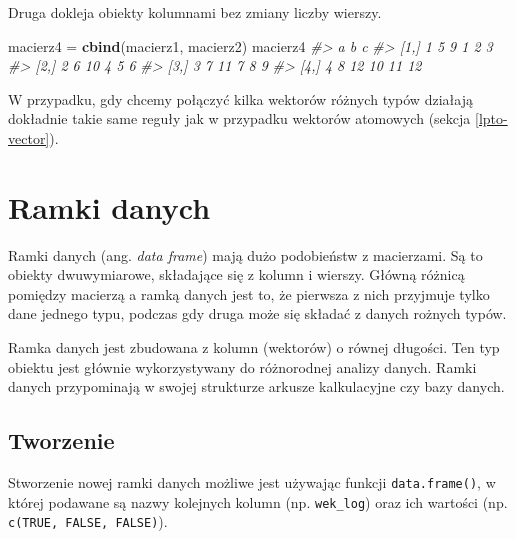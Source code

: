 \documentclass[paper=6in:9in,pagesize=pdftex,headinclude=on,footinclude=on,10pt]{scrbook}
\newenvironment{Shaded}{\begin{snugshade}}{\end{snugshade}}
\newcommand{\CommentTok}[1]{\textcolor[rgb]{0.56,0.35,0.01}{\textit{#1}}}
\newcommand{\KeywordTok}[1]{\textcolor[rgb]{0.13,0.29,0.53}{\textbf{#1}}}
\newcommand{\NormalTok}[1]{#1}
\newcommand{\StringTok}[1]{\textcolor[rgb]{0.31,0.60,0.02}{#1}}
\let\BeginKnitrBlock\begin \let\EndKnitrBlock\end
\begin{document}
Druga dokleja obiekty kolumnami bez zmiany liczby wierszy.

\begin{Shaded}
\begin{Highlighting}[]
\NormalTok{macierz4 =}\StringTok{ }\KeywordTok{cbind}\NormalTok{(macierz1, macierz2)}
\NormalTok{macierz4}
\CommentTok{#>              a  b  c}
\CommentTok{#> [1,] 1 5  9  1  2  3}
\CommentTok{#> [2,] 2 6 10  4  5  6}
\CommentTok{#> [3,] 3 7 11  7  8  9}
\CommentTok{#> [4,] 4 8 12 10 11 12}
\end{Highlighting}
\end{Shaded}

\BeginKnitrBlock{rmdinfo}
W przypadku, gdy chcemy połączyć kilka wektorów różnych typów działają dokładnie takie same reguły jak w przypadku wektorów atomowych (sekcja \ref{lpto-vector}).
\EndKnitrBlock{rmdinfo}

\hypertarget{df}{%
\section{Ramki danych}\label{df}}

Ramki danych (ang. \emph{data frame}) mają dużo podobieństw z macierzami.
Są to obiekty dwuwymiarowe, składające się z kolumn i wierszy.
Główną różnicą pomiędzy macierzą a ramką danych jest to, że pierwsza z nich przyjmuje tylko dane jednego typu, podczas gdy druga może się składać z danych rożnych typów.

Ramka danych jest zbudowana z kolumn (wektorów) o równej długości.
Ten typ obiektu jest głównie wykorzystywany do różnorodnej analizy danych.
Ramki danych przypominają w swojej strukturze arkusze kalkulacyjne czy bazy danych.

\hypertarget{tworzenie-1}{%
\subsection{Tworzenie}\label{tworzenie-1}}

Stworzenie nowej ramki danych możliwe jest używając funkcji \texttt{data.frame()}, w której podawane są nazwy kolejnych kolumn (np. \texttt{wek\_log}) oraz ich wartości (np. \texttt{c(TRUE,\ FALSE,\ FALSE)}).
\end{document}
